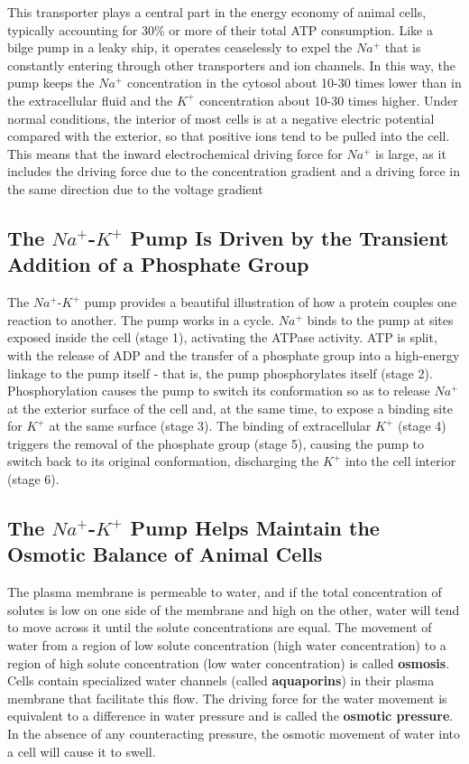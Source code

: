 This transporter plays a central part in the energy economy of animal
cells, typically accounting for 30\% or more of their total ATP consumption.
Like a bilge pump in a leaky ship, it operates ceaselessly to expel the
$Na^{+}$ that is constantly entering through other transporters and ion channels.
In this way, the pump keeps the $Na^{+}$ concentration in the cytosol
about 10-30 times lower than in the extracellular fluid and the $K^{+}$ concentration
about 10-30 times higher. Under normal
conditions, the interior of most cells is at a negative electric potential
compared with the exterior, so that positive ions tend to be pulled into
the cell. This means that the inward electrochemical driving force for $Na^{+}$
is large, as it includes the driving force due to the concentration gradient
and a driving force in the same direction due to the voltage gradient

\subsection{The $Na^{+}$-$K^{+}$ Pump Is Driven by the Transient Addition of a Phosphate Group}

The $Na^{+}$-$K^{+}$ pump provides a beautiful illustration of how a protein
couples one reaction to another. The pump works in a cycle.
$Na^{+}$ binds to the pump at sites exposed inside the cell (stage 1),
activating the ATPase activity. ATP is split, with the release of ADP and
the transfer of a phosphate group into a high-energy linkage to the pump
itself - that is, the pump phosphorylates itself (stage 2). Phosphorylation
causes the pump to switch its conformation so as to release $Na^{+}$ at the
exterior surface of the cell and, at the same time, to expose a binding
site for $K^{+}$ at the same surface (stage 3). The binding of extracellular $K^{+}$
(stage 4) triggers the removal of the phosphate group (stage 5), causing
the pump to switch back to its original conformation, discharging the $K^{+}$
into the cell interior (stage 6).

\subsection{The $Na^{+}$-$K^{+}$ Pump Helps Maintain the Osmotic Balance of Animal Cells}

The plasma membrane is permeable to water, and if
the total concentration of solutes is low on one side of the membrane
and high on the other, water will tend to move across it until the solute
concentrations are equal. The movement of water from a region of low
solute concentration (high water concentration) to a region of high solute
concentration (low water concentration) is called \textbf{osmosis}. Cells contain
specialized water channels (called \textbf{aquaporins}) in their plasma membrane
that facilitate this flow. The driving force for the water movement
is equivalent to a difference in water pressure and is called the \textbf{osmotic
pressure}. In the absence of any counteracting pressure, the osmotic
movement of water into a cell will cause it to swell.

